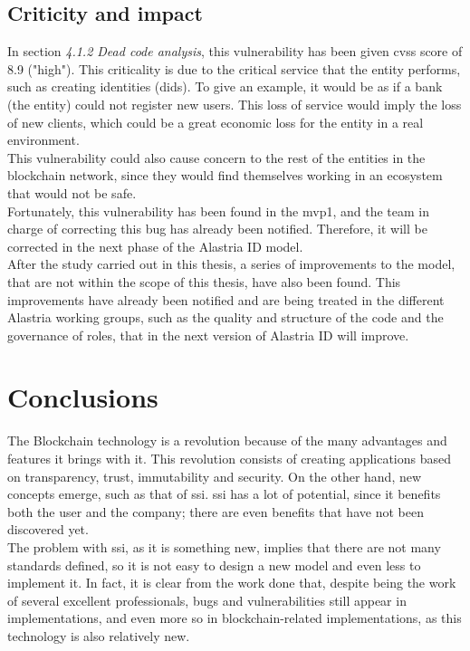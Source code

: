 \documentclass[a4paper, 12pt]{article} %
\begin{document}
    \subsection{Criticity and impact}
        In section \textit{4.1.2 Dead code analysis}, this vulnerability has been given \acrshort{cvss} score of 8.9 ("high"). This criticality is due to the critical service that the entity performs, such as creating identities (\acrshort{did}s). To give an example, it would be as if a bank (the entity) could not register new users. This loss of service would imply the loss of new clients, which could be a great economic loss for the entity in a real environment.\\

        This vulnerability could also cause concern to the rest of the entities in the blockchain network, since they would find themselves working in an ecosystem that would not be safe.\\
        
        Fortunately, this vulnerability has been found in the \acrshort{mvp}1, and the team in charge of correcting this bug has already been notified. Therefore, it will be corrected in the next phase of the Alastria ID model.\\
        
        After the study carried out in this thesis, a series of improvements to the model, that are not within the scope of this thesis, have also been found. This improvements have already been notified and are being treated in the different Alastria working groups, such as the quality and structure of the code and the governance of roles, that in the next version of Alastria ID will improve.
        
\newpage
\section{Conclusions}
    The Blockchain technology is a revolution because of the many advantages and features it brings with it.  This revolution consists of creating applications based on transparency, trust, immutability and security. On the other hand, new concepts emerge, such as that of \acrlong{ssi}. \acrlong{ssi} has a lot of potential, since it benefits both the user and the company; there are even benefits that have not been discovered yet.\\
    
    The problem with \acrlong{ssi}, as it is something new, implies that there are not many standards defined, so it is not easy to design a new model and even less to implement it. In fact, it is clear from the work done that, despite being the work of several excellent professionals, bugs and vulnerabilities still appear in implementations, and even more so in blockchain-related implementations, as this technology is also relatively new.\\
    
\end{document}
